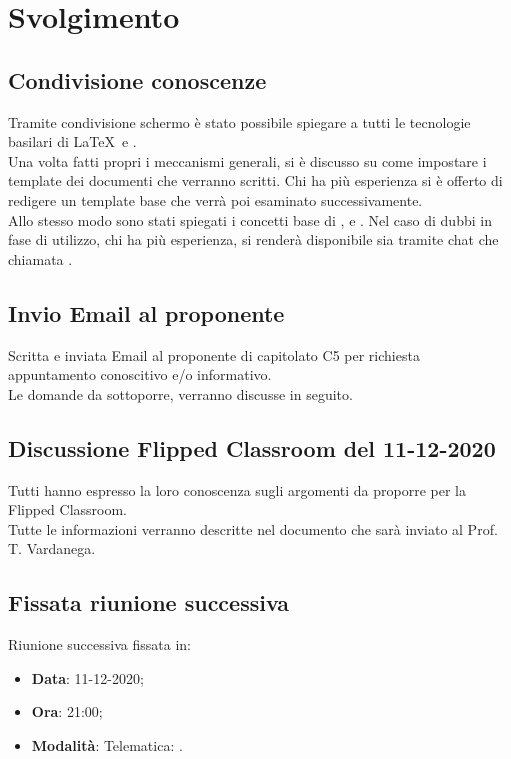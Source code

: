 \documentclass[]{article}
\begin{document}
\newpage

\section{Svolgimento}
	\subsection{Condivisione conoscenze}
	Tramite condivisione schermo è stato possibile spiegare a tutti le tecnologie basilari di \LaTeX\ e . \\
	Una volta fatti propri i meccanismi generali, si è discusso su come impostare i template dei documenti che verranno scritti. Chi ha più esperienza si è offerto di redigere un template base che verrà poi esaminato successivamente.\\
	Allo stesso modo sono stati spiegati i concetti base di ,  e . Nel caso di dubbi in fase di utilizzo, chi ha più esperienza, si renderà disponibile sia tramite chat che chiamata .\\

	\subsection{Invio Email al proponente}
	Scritta e inviata Email al proponente di capitolato C5 per richiesta appuntamento conoscitivo e/o informativo. \\
	Le domande da sottoporre, verranno discusse in seguito.\\

	\subsection{Discussione Flipped Classroom del 11-12-2020}
	Tutti hanno espresso la loro conoscenza sugli argomenti da proporre per la Flipped Classroom.\\
	Tutte le informazioni verranno descritte nel documento che sarà inviato al Prof. T. Vardanega.\\

	\subsection{Fissata riunione successiva}
	Riunione successiva fissata in:
	\begin{itemize}
		\item \textbf{Data}: 11-12-2020;
		\item \textbf{Ora}: 21:00;
		\item \textbf{Modalità}: Telematica: .
	\end{itemize}
\end{document}
